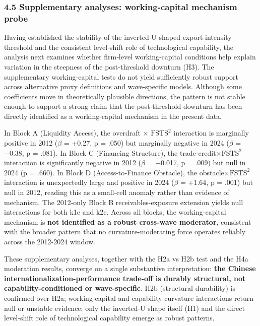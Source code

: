\documentclass[12pt,a4paper]{article}
\begin{document}
\hypertarget{45-supplementary-analyses-working-capital-mechanism-probe}{%
\subsubsection{4.5 Supplementary analyses: working-capital mechanism
probe}\label{45-supplementary-analyses-working-capital-mechanism-probe}}

Having established the stability of the inverted U‑shaped
export‑intensity threshold and the consistent level‑shift role of
technological capability, the analysis next examines whether firm‑level
working‑capital conditions help explain variation in the steepness of
the post‑threshold downturn (H3). The supplementary working‑capital
tests do not yield sufficiently robust support across alternative proxy
definitions and wave‑specific models. Although some coefficients move in
theoretically plausible directions, the pattern is not stable enough to
support a strong claim that the post‑threshold downturn has been
directly identified as a working‑capital mechanism in the present data.

In Block A (Liquidity Access), the overdraft \(\times\)
\(\mathrm{FSTS}^2\) interaction is marginally positive in 2012
(\(\beta\) = +0.27, p = .050) but marginally negative in 2024 (\(\beta\)
= −0.38, p = .081). In Block C (Financing Structure), the
trade-credit\(\times\)\(\mathrm{FSTS}^2\) interaction is significantly
negative in 2012 (\(\beta\) = −0.017, p = .009) but null in 2024 (p =
.660). In Block D (Access‑to‑Finance Obstacle), the
obstacle\(\times\)\(\mathrm{FSTS}^2\) interaction is unexpectedly large
and positive in 2024 (\(\beta\) = +1.64, p = .001) but null in 2012,
reading this as a small‑cell anomaly rather than evidence of mechanism.
The 2012‑only Block B receivables-exposure extension yields null
interactions for both k1c and k2c. Across all blocks, the
working-capital mechanism is \textbf{not identified as a robust
cross-wave moderator}, consistent with the broader pattern that no
curvature-moderating force operates reliably across the 2012-2024
window.

These supplementary analyses, together with the H2a vs H2b test and the
H4a moderation results, converge on a single substantive interpretation:
\textbf{the Chinese internationalization-performance trade-off is
durably structural, not capability-conditioned or wave-specific}. H2b
(structural durability) is confirmed over H2a; working-capital and
capability curvature interactions return null or unstable evidence; only
the inverted-U shape itself (H1) and the direct level-shift role of
technological capability emerge as robust patterns.
\end{document}
